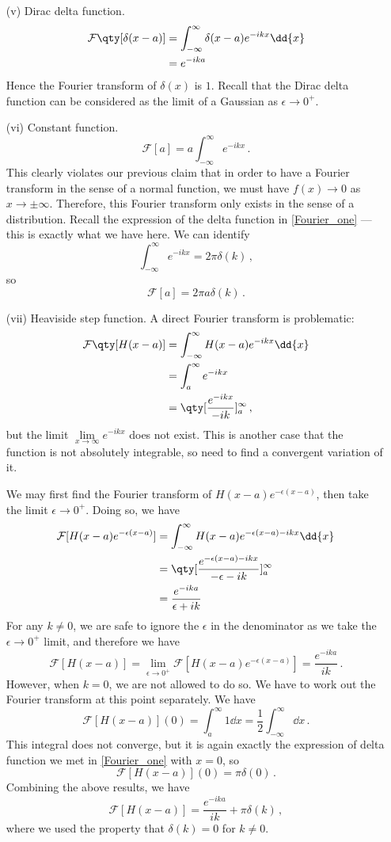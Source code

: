 \documentclass{article}
\theoremstyle{plain}\theoremheaderfont{\normalfont\itshape}\theorembodyfont{\rmfamily}\theoremseparator{.}\newtheorem*{rem}{Remark}\newtheorem*{ex}{Example}\newtheorem*{proof}{Proof}\newtheorem*{altp}{Alternative proof}
\theoremstyle{plain}\theoremheaderfont{\normalfont\bfseries}\theorembodyfont{\rmfamily}\theoremseparator{.}\newtheorem{thm}{Theorem}[section]\newtheorem{lem}[thm]{Lemma}\newtheorem{prop}[thm]{Proposition}\newtheorem*{cor}{Corollary}\newtheorem{defn}[thm]{Definition}\newtheorem{clm}[thm]{Claim}\newtheorem{clminproof}{Claim}
\theoremstyle{break}\theoremheaderfont{\normalfont\itshape}\theorembodyfont{\rmfamily}\theoremseparator{.\medskip}\newtheorem*{proofskip}{Proof}\newtheorem*{exs}{Examples}\newtheorem*{rems}{Remarks}
\theoremstyle{break}\theoremheaderfont{\normalfont\bfseries}\theorembodyfont{\rmfamily}\theoremseparator{.\medskip}\newtheorem{lemskip}[thm]{Lemma}\newtheorem{defnskip}[thm]{Definition}\newtheorem{propskip}[thm]{Proposition}\newtheorem{thmskip}[thm]{Theorem}
\numberwithin{equation}{section}
\begin{document}
\begin{itemize}
		\item[(v)] Dirac delta function.
		\begin{align*}
			\mathcal{F}\qty[\delta(x-a)]&=\int_{-\infty}^{\infty}\delta(x-a)e^{-ikx}\dd{x}\\
			&=e^{-ika}			
		\end{align*}
		Hence the Fourier transform of \(\delta(x)\) is \(1\). Recall that the Dirac delta function can be considered as the limit of a Gaussian as \(\epsilon\to 0^+\).

		\item[(vi)] Constant function.
		\[\mathcal{F}[a]=a\int_{-\infty}^{\infty}e^{-ikx}\,.\]
		This clearly violates our previous claim that in order to have a Fourier transform in the sense of a normal function, we must have \(f(x)\to 0\) as \(x\to\pm\infty\). Therefore, this Fourier transform only exists in the sense of a distribution. Recall the expression of the delta function in \cref{Fourier_one} --- this is exactly what we have here. We can identify
		\[\int_{-\infty}^{\infty}e^{-ikx}=2\pi\delta(k)\,,\]
		so
		\[\mathcal{F}[a]=2\pi a\delta(k)\,.\]
		
		\item[(vii)] Heaviside step function. A direct Fourier transform is problematic:
		\begin{align*}
			\mathcal{F}\qty[H(x-a)]&=\int_{-\infty}^{\infty}H(x-a)e^{-ikx}\dd{x}\\
			&=\int_{a}^{\infty}e^{-ikx}\\
			&=\qty[\frac{e^{-ikx}}{-ik}]_{a}^{\infty}\,,
		\end{align*}
		but the limit \(\lim\limits_{x\to\infty}e^{-ikx}\) does not exist. This is another case that the function is not absolutely integrable, so need to find a convergent variation of it.
		
		We may first find the Fourier transform of \(H(x-a)e^{-\epsilon(x-a)}\), then take the limit \(\epsilon\to 0^+\). Doing so, we have
		\begin{align*}
			\mathcal{F}[H(x-a)e^{-\epsilon(x-a)}]&=\int_{-\infty}^{\infty}H(x-a)e^{-\epsilon(x-a)-ikx}\dd{x}\\
			&=\qty[\frac{e^{-\epsilon(x-a)-ikx}}{-\epsilon-ik}]_a^\infty\\
			&=\frac{e^{-ika}}{\epsilon+ik}
		\end{align*}
		For any \(k\ne 0\), we are safe to ignore the \(\epsilon\) in the denominator as we take the \(\epsilon\to 0^+\) limit, and therefore we have
		\[\mathcal{F}[H(x-a)]=\lim_{\epsilon\to 0^+}\mathcal{F}[H(x-a)e^{-\epsilon(x-a)}]=\frac{e^{-ika}}{ik}\,.\]
		However, when \(k=0\), we are not allowed to do so. We have to work out the Fourier transform at this point separately. We have
		\[\mathcal{F}[H(x-a)](0)=\int_{a}^{\infty}1\dd{x}=\frac{1}{2}\int_{-\infty}^{\infty}\dd{x}\,.\]
		This integral does not converge, but it is again exactly the expression of delta function we met in \cref{Fourier_one} with \(x=0\), so
		\[\mathcal{F}[H(x-a)](0)=\pi\delta(0)\,.\]
		Combining the above results, we have
		\[\mathcal{F}[H(x-a)]=\frac{e^{-ika}}{ik}+\pi\delta(k)\,,\]
		where we used the property that \(\delta(k)=0\) for \(k\ne 0\).


\end{itemize}
\end{document}
